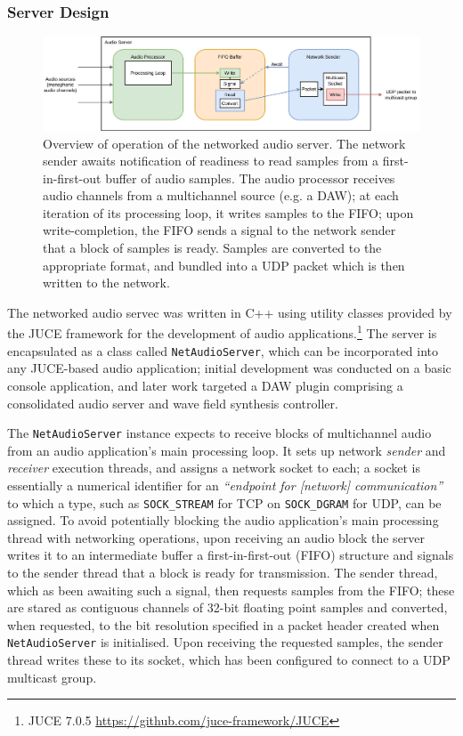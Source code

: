 \subsubsection{Server Design}

\begin{figure}[ht]
    \centering
    \includegraphics[width=\textwidth]{figures/audio-server}
    \caption{Overview of operation of the networked audio server.
    The network sender awaits notification of readiness to read samples from a
    first-in-first-out buffer of audio samples.
    The audio processor receives audio channels from a multichannel source
        (e.g. a DAW); at each iteration of its processing loop, it writes samples
        to the FIFO; upon write-completion, the FIFO sends a signal to the network
        sender that a block of samples is ready.
        Samples are converted to the appropriate format, and bundled into a UDP
        packet which is then written to the network.}
    \label{fig:audio-server}
\end{figure}

The networked audio servec was written in C++ using utility classes provided by
the JUCE framework for the development of audio applications.\footnote{
    JUCE 7.0.5 \url{https://github.com/juce-framework/JUCE}
}
The server is encapsulated as a class called \texttt{NetAudioServer},
which can be incorporated into any JUCE-based audio application;
initial development was conducted on a basic console application, and later work
targeted a DAW plugin comprising a consolidated audio server and wave field
synthesis controller.

The \texttt{NetAudioServer} instance expects to receive blocks of
multichannel audio from an audio application's main processing loop.
It sets up network \textit{sender} and \textit{receiver} execution threads, and
assigns a network socket to each; a socket is essentially a numerical identifier
for an \textit{``endpoint for [network] communication''}
~\citep{noauthor_socket2_nodate} to which a type, such as \texttt{SOCK\_STREAM}
for TCP on \texttt{SOCK\_DGRAM} for UDP, can be assigned.
To avoid potentially blocking the audio application's main processing thread
with networking operations, upon receiving an audio block the server writes it
to an intermediate buffer \textemdash{} a first-in-first-out (FIFO) structure
\textemdash{} and signals to the sender thread that a block is ready for
transmission.
The sender thread, which as been awaiting such a signal, then requests samples
from the FIFO; these are stared as contiguous channels of 32-bit floating point
samples and converted, when requested, to the bit resolution specified in a
packet header created when \texttt{NetAudioServer} is initialised.
Upon receiving the requested samples, the sender thread writes these to its
socket, which has been configured to connect to a UDP multicast group.

